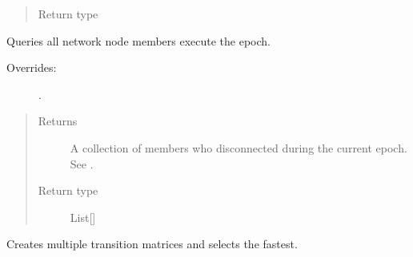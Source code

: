 \documentclass[letterpaper,10pt,english]{sphinxmanual}
\begin{document}
\begin{fulllineitems}
\begin{fulllineitems}
\begin{quote}
\begin{description}
\item[{Return type}] \leavevmode
{}

\end{description}\end{quote}

\end{fulllineitems}


\begin{fulllineitems}
\label{\detokenize{app.domain:app.domain.cluster_groups.SGClusterPerfect.nodes_execute}}
Queries all network node members execute the epoch.
\begin{description}
\item[{Overrides:}] \leavevmode
{\hyperref[\detokenize{app.domain:app.domain.cluster_groups.Cluster.nodes_execute}]{}}.

\end{description}
\begin{quote}\begin{description}
\item[{Returns}] \leavevmode
A collection of members who disconnected during the current
epoch. See
{\hyperref[\detokenize{app.domain:app.domain.network_nodes.Node.update_status}]{}}.

\item[{Return type}] \leavevmode
List{[}{\hyperref[\detokenize{app:app.type_hints.NodeType}]{}}{]}

\end{description}\end{quote}

\end{fulllineitems}


\begin{fulllineitems}
\label{\detokenize{app.domain:app.domain.cluster_groups.SGClusterPerfect.select_fastest_topology}}
Creates multiple transition matrices and selects the fastest.


\end{fulllineitems}
\end{fulllineitems}
\end{document}
